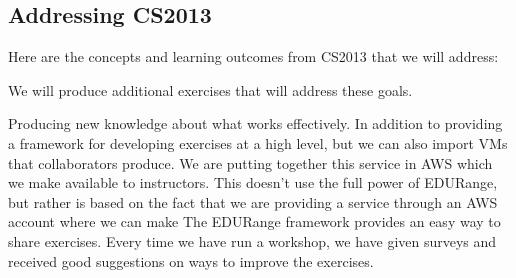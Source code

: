 \subsection{Addressing CS2013}
Here are the concepts and learning outcomes from CS2013 that we will address:


We will produce additional exercises that will address these goals.

Producing new knowledge about what works effectively.  
In addition to providing a framework for developing exercises at a high level, but we can also 
import VMs that collaborators produce.  We are putting together this service in AWS which we make available
to instructors.  This doesn't use the full power of EDURange, but rather is based on the fact that we
are providing a service through an AWS account where we can make 
The EDURange framework provides an easy way to share exercises.  Every time we have run a workshop, we 
have given surveys and received good suggestions on ways to improve the exercises.


